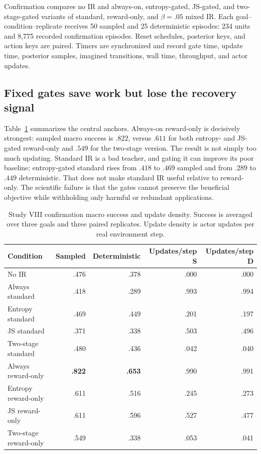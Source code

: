 \documentclass[10pt]{article}
\begin{document}
Confirmation compares no IR and always-on, entropy-gated, JS-gated, and
two-stage-gated variants of standard, reward-only, and $\beta=.05$ mixed IR.
Each goal--condition--replicate receives 50 sampled and 25 deterministic
episodes: 234 units and 8,775 recorded confirmation episodes. Reset schedules,
posterior keys, and action keys are paired. Timers are synchronized and record
gate time, update time, posterior samples, imagined transitions, wall time,
throughput, and actor updates.

\subsection{Fixed gates save work but lose the recovery signal}

Table~\ref{tab:stage5amacro} summarizes the central anchors. Always-on
reward-only is decisively strongest: sampled macro success is $.822$, versus
$.611$ for both entropy- and JS-gated reward-only and $.549$ for the two-stage
version. The result is not simply too much updating. Standard IR is a bad
teacher, and gating it can improve its poor baseline; entropy-gated standard
rises from $.418$ to $.469$ sampled and from $.289$ to $.449$ deterministic.
That does not make standard IR useful relative to reward-only. The scientific
failure is that the gates cannot preserve the beneficial objective while
withholding only harmful or redundant applications.

\begin{table}[H]
\centering
\small
\caption{Study VIII confirmation macro success and update density. Success is averaged over three goals and three paired replicates. Update density is actor updates per real environment step.}
\label{tab:stage5amacro}
\begin{tabular}{lrrrr}
\toprule
Condition & Sampled & Deterministic & Updates/step S & Updates/step D \\
\midrule
No IR & .476 & .378 & .000 & .000 \\
Always standard & .418 & .289 & .993 & .994 \\
Entropy standard & .469 & .449 & .201 & .197 \\
JS standard & .371 & .338 & .503 & .496 \\
Two-stage standard & .480 & .436 & .042 & .040 \\
Always reward-only & \textbf{.822} & \textbf{.653} & .990 & .991 \\
Entropy reward-only & .611 & .516 & .245 & .273 \\
JS reward-only & .611 & .596 & .527 & .477 \\
Two-stage reward-only & .549 & .338 & .053 & .041 \\
\bottomrule
\end{tabular}
\end{table}
\end{document}
